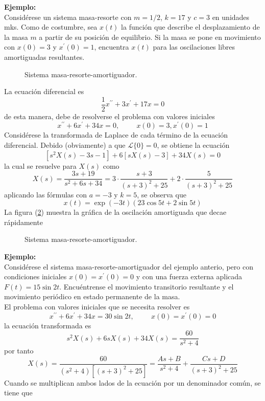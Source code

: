 \textbf{Ejemplo:}
\\
Considérese un sistema masa-resorte con $m = 1/2$, $k = 17$ y $c = 3$ en unidades mks. Como de costumbre, sea $x(t)$ la función que describe el desplazamiento de la masa $m$ a partir de su posición de equilibrio. Si la masa se pone en movimiento con $x(0)= 3$ y $x^{\prime}(0) = 1$, encuentra $x(t)$ para las oscilaciones libres amortiguadas resultantes.
\begin{figure}[H]
\centering

\label{fig:figura_008}
\caption{Sistema masa-resorte-amortiguador.}
\end{figure}
La ecuación diferencial es
\[ \dfrac{1}{2} x^{\prime \prime} + 3 x^{\prime} + 17 x = 0 \]
de esta manera, debe de resolverse el problema con valores iniciales
\[ x^{\prime \prime} + 6 x^{\prime} + 34 x = 0, \hspace{1cm} x(0) = 3, x^{\prime}(0) = 1 \]
Considérese la transformada de Laplace de cada término de la ecuación diferencial. Debido (obviamente) a que $\mathscr{L} \{ 0 \} = 0 $, se obtiene la ecuación
\[ [s^{2} X(s) - 3 s - 1] + 6 [s X(s) - 3] +  34 X(s) = 0 \]
la cual se resuelve para $X(s)$ como 
\[ X(s) = \dfrac{3s + 19}{s^{2} + 6s + 34} =  3 \cdot \dfrac{s + 3}{(s+3)^{2} + 25} + 2 \cdot \dfrac{5}{(s+3)^{2} + 25} \]
aplicando las fórmulas con $a=-3$ y $k=5$, se observa que
\[ x(t) = \exp(-3t) (23 \cos 5t  + 2 \sin 5t) \]
La figura (\ref{fig:figura_009}) muestra la gráfica de la oscilación amortiguada que decae rápidamente
\begin{figure}[H]
\centering

\label{fig:figura_009}
\caption{Sistema masa-resorte-amortiguador.}
\end{figure}
\textbf{Ejemplo:}
\\
Considérese el sistema masa-resorte-amortiguador del ejemplo anterio, pero con condiciones iniciales $x(0) = x^{\prime}(0) = 0$ y con una fuerza externa aplicada $F(t) = 15 \sin 2t$. Encuéntrense el movimiento transitorio resultante y el movimiento periódico en estado permanente de la masa.
\\
El problema con valores iniciales que se necesita resolver es
\[ x^{\prime \prime} + 6 x^{\prime} + 34 x =  30  \sin 2t, \hspace{1cm} x(0) = x^{\prime}(0) = 0 \]
la ecuación transformada es
\[ s^{2} X(s) + 6 s X(s) + 34 X(s) = \dfrac{60}{s^{2} + 4} \]
por tanto
\[ X(s) = \dfrac{60}{(s^{2} + 4)[(s+3)^{2} + 25]} = \dfrac{As + B}{s^{2} + 4} + \dfrac{Cs + D}{(s+3)^{2} + 25} \]
Cuando se multiplican ambos lados de la ecuación por un denominador común, se tiene que
